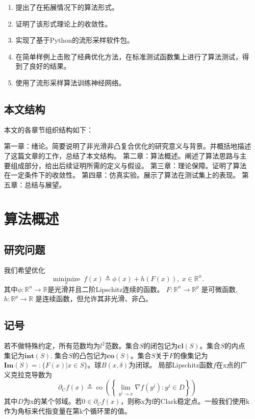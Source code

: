\documentclass[macfonts]{njuthesis}
\begin{document}
\begin{enumerate}
\item 提出了在拓展情况下的算法形式。

\item 证明了该形式理论上的收敛性。

\item 实现了基于Python的流形采样软件包。
\item 在简单样例上击败了经典优化方法，在标准测试函数集上进行了算法测试，得到了良好的结果。
\item 使用了流形采样算法训练神经网络。

\end{enumerate}

\section{本文结构}
本文的各章节组织结构如下：

第一章：绪论。简要说明了非光滑非凸复合优化的研究意义与背景。并概括地描述了这篇文章的工作，总结了本文结构。
第二章：算法概述。阐述了算法思路与主要组成部分，给出后续证明所需的定义与假设。
第三章：理论保障。证明了算法在一定条件下的收敛性。
第四章：仿真实验。展示了算法在测试集上的表现。
第五章：总结与展望。

\chapter{算法概述}

\section{研究问题}

我们希望优化
$$
\underset{x}{\operatorname{minimize}} \; f(x) \triangleq \phi(x)+h(F(x)),  \; x \in \mathbb{R}^n. 
$$
其中$\phi: \mathbb{R}^n\rightarrow \mathbb{R}$是光滑并且二阶Lipschitz连续的函数。  $F: \mathbb{R}^{n} \rightarrow \mathbb{R}^{p}$ 是可微函数, $h: \mathbb{R}^{p} \rightarrow \mathbb{R}$ 是连续函数，但允许其非光滑、非凸。


\section{记号}

若不做特殊约定，所有范数均为$l^2$范数。集合$S$的闭包记为$\mathbf{cl}(S)$。集合$S$的内点集记为$\mathbf{int}(S)$. 集合$S$的凸包记为$\mathbf{co}(S)$。集合$S$关于$F$的像集记为$\mathbf{Im}(S)=:\{F(x)|x\in S\}$。球$B(x,\delta)$为闭球。
局部Lipschitz函数$f$在x点的广义克拉克导数为$$
\partial_{\mathrm{C}} f(x) \triangleq \operatorname{co}\left(\left\{\lim _{y^{j} \rightarrow x} \nabla f\left(y^{j}\right): y^{j} \in D\right\}\right)
$$
其中$D$为x的某个邻域。若$0\in\partial_Cf(x)$，则称x为f的Clark稳定点。一般我们使用k作为角标来代指变量在第k个循环里的值。
\end{document}
